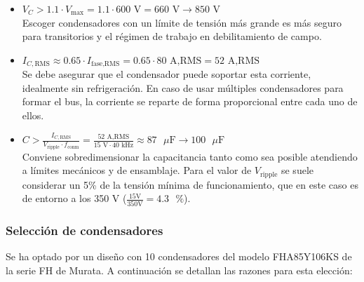 \begin{itemize}
	\item \( V_C > 1.1 \cdot V_{\text{max}} = 1.1 \cdot 600 \text{ V} = 660 \text{ V} \rightarrow 850 \text{ V} \) \\
		Escoger condensadores con un límite de tensión más grande es más seguro para transitorios y el régimen de trabajo en debilitamiento de campo.
	\item \( I_{C,\text{RMS}} \approx 0.65 \cdot I_{\text{fase,RMS}} = 0.65 \cdot 80 \text{ A,RMS} = 52 \text{ A,RMS}\) \\
		Se debe asegurar que el condensador puede soportar esta corriente, idealmente sin refrigeración. En caso de usar múltiples condensadores para formar el bus, la corriente se reparte de forma proporcional entre cada uno de ellos.
	\item \( C > \frac{I_{C,\text{RMS}}}{V_{\text{ripple}} \cdot f_{\text{conm}}} = \frac{52 \text{ A,RMS}}{15 \text{ V} \cdot 40 \text{ kHz}} \approx 87 \text{ }\mu\text{F} \rightarrow 100 \text{ }\mu\text{F} \)\\
		Conviene sobredimensionar la capacitancia tanto como sea posible atendiendo a límites mecánicos y de ensamblaje. Para el valor de $V_{\text{ripple}}$ se suele considerar un 5\% de la tensión mínima de funcionamiento, que en este caso es de entorno a los 350 V ($\frac{15 \text{V}}{350 \text{V}} = 4.3\text{ }\%$).
\end{itemize}

\subsubsection{Selección de condensadores}

Se ha optado por un diseño con 10 condensadores del modelo FHA85Y106KS de la serie FH de Murata. A continuación se detallan las razones para esta elección:

